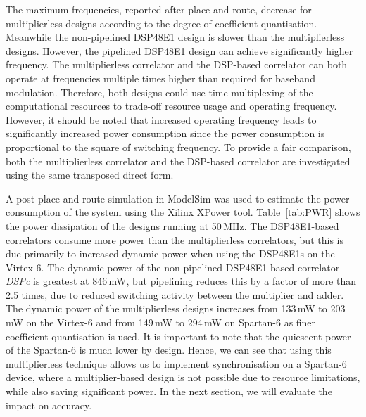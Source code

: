 The maximum frequencies, reported after place and route, decrease for multiplierless designs according to the degree of coefficient quantisation.
Meanwhile the non-pipelined DSP48E1 design is slower than the multiplierless designs.
However, the pipelined DSP48E1 design can achieve significantly higher frequency.
The multiplierless correlator and the DSP-based correlator can both operate at frequencies multiple times higher than required for baseband modulation. Therefore, both designs could use time multiplexing of the computational resources to trade-off resource usage and operating frequency. However, it should be noted that increased operating frequency leads to significantly increased power consumption since the power consumption is proportional to the square of switching frequency. To provide a fair comparison, both the multiplierless correlator and the DSP-based correlator are investigated using the same transposed direct form.

A post-place-and-route simulation in ModelSim was used to estimate the power consumption of the system using the Xilinx XPower tool.
Table~\ref{tab:PWR} shows the power dissipation of the designs running at 50\,MHz.
The DSP48E1-based correlators consume more power than the multiplierless correlators, but this is due primarily to increased dynamic power when using the DSP48E1s on the Virtex-6.
The dynamic power of the non-pipelined DSP48E1-based correlator \emph{DSPc} is greatest at 846\,mW, but pipelining reduces this by a factor of more than 2.5 times, due to reduced switching activity between the multiplier and adder.
The dynamic power of the multiplierless designs increases from 133\,mW to 203\,mW on the Virtex-6 and from 149\,mW to 294\,mW on Spartan-6 as finer coefficient quantisation is used.
It is important to note that the quiescent power of the Spartan-6 is much lower by design.
Hence, we can see that using this multiplierless technique allows us to implement synchronisation on a Spartan-6 device, where a multiplier-based design is not possible due to resource limitations, while also saving significant power.
In the next section, we will evaluate the impact on accuracy.

